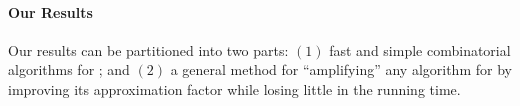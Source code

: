 \documentclass[a4paper,UKenglish,cleveref, autoref]{lipics-v2019}
\begin{document}


%
%

\paragraph*{Our Results}
Our results can be partitioned into two parts: $(1)$ fast and simple combinatorial algorithms for \SK; and $(2)$ a general method for ``amplifying'' any algorithm for \SK by improving its approximation factor while losing little in the running time.
\end{document}
